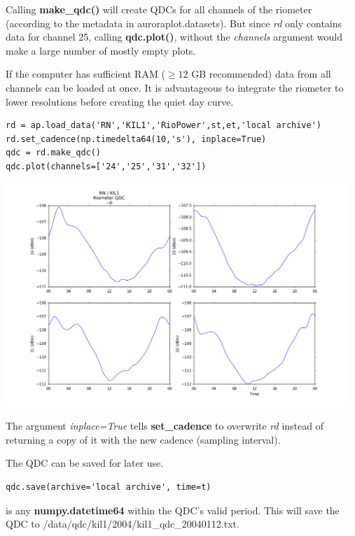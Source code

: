 \documentclass{article}
\begin{document}
\noindent Calling {\bf make\_qdc()} will create QDCs for all channels of the riometer (according to the metadata in auroraplot.datasets). But since {\it rd} only contains data for channel 25, calling {\bf qdc.plot()}, without the {\it channels} argument would make a large number of mostly empty plots.

If the computer has sufficient RAM ($\ge 12$ GB recommended) data from all channels can be loaded at once. It is advantageous to integrate the riometer to lower resolutions before creating the quiet day curve.

\begin{lstlisting}[style=pythonstyle]
rd = ap.load_data('RN','KIL1','RioPower',st,et,'local archive')
rd.set_cadence(np.timedelta64(10,'s'), inplace=True)
qdc = rd.make_qdc()
qdc.plot(channels=['24','25','31','32'])
\end{lstlisting}

\begin{center}
\includegraphics[width=13cm]{images/figure_3.png}
\end{center}

\noindent The argument {\it inplace=True} tells {\bf set\_cadence} to overwrite {\it rd} instead of returning a copy of it with the new cadence (sampling interval).

The QDC can be saved for later use.

\begin{lstlisting}[style=pythonstyle]
qdc.save(archive='local archive', time=t)
\end{lstlisting}

 is any {\bf numpy.datetime64} within the QDC's valid period. This will save the QDC to /data/qdc/kil1/2004/kil1\_qdc\_20040112.txt.
\end{document}
